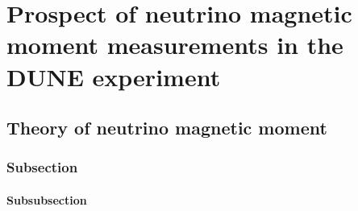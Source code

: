 \chapter{Prospect of neutrino magnetic moment measurements in the DUNE experiment}\label{chapterNeutrinoMagMomentDUNE}


\section{Theory of neutrino magnetic moment}

\subsection{Subsection}

\subsubsection{Subsubsection}